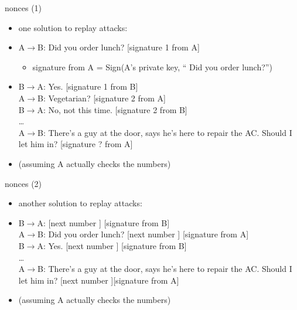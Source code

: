 \begin{frame}{nonces (1)}
    \begin{itemize}
    \item one solution to replay attacks:
    \item A$\rightarrow$B:  Did you order lunch? [signature 1 from A] 
        \begin{itemize}
        \item signature from A = Sign(A's private key, `` Did you order lunch?'')
        \end{itemize}
    \item B$\rightarrow$A:  Yes. [signature 1 from B] \\
    A$\rightarrow$B:  Vegetarian? [signature 2 from A] \\
    B$\rightarrow$A:  No, not this time. [signature 2 from B] \\
    \ldots \\
    A$\rightarrow$B:  There's a guy at the door, says he's here to repair the AC. Should I let him in? [signature ? from A] \\
    \vspace{.5cm}
    \item (assuming A actually checks the numbers)
    \end{itemize}
\end{frame}

\begin{frame}{nonces (2)}
    \begin{itemize}
    \item another solution to replay attacks:
    \item B$\rightarrow$A: [next number ] [signature from B] \\
    A$\rightarrow$B:  Did you order lunch? [next number ] [signature from A] \\
    B$\rightarrow$A:  Yes. [next number ] [signature from B] \\
    \ldots \\
    A$\rightarrow$B:  There's a guy at the door, says he's here to repair the AC. Should I let him in? [next number ][signature from A] 
    \vspace{.5cm}
    \item (assuming A actually checks the numbers)
    \end{itemize}
\end{frame}

